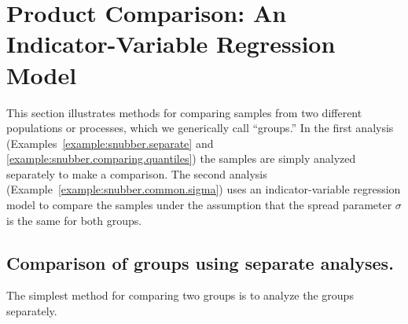 \section{Product Comparison: An Indicator-Variable Regression Model}
\label{section:product.comparison}
This section illustrates methods for comparing samples from two
different populations or processes, which we generically call
``groups.'' In the first analysis 
(Examples~\ref{example:snubber.separate} and 
\ref{example:snubber.comparing.quantiles}) the samples are simply analyzed
separately to make a comparison.  The second analysis 
(Example~\ref{example:snubber.common.sigma}) uses an
indicator-variable regression model to compare the samples under the
assumption that the spread parameter $\sigma$ is the same for both
groups.

\subsection{Comparison of groups using separate analyses.}
The simplest method for comparing two groups is to analyze the
groups separately.

